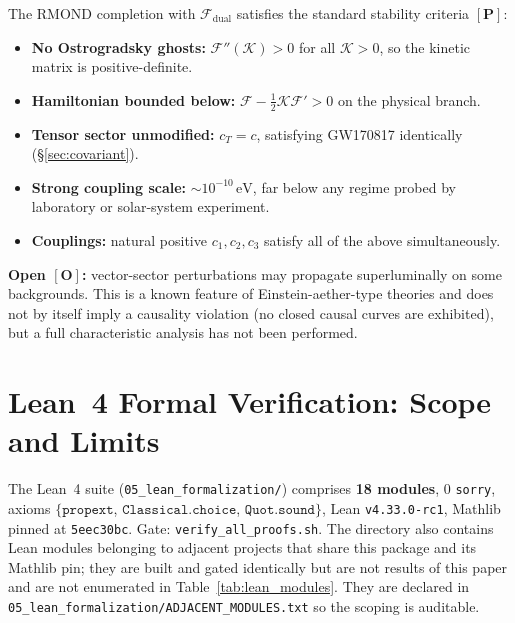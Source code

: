 \documentclass[aps,prd,preprint,superscriptaddress,nofootinbib,amsmath,amssymb,floatfix]{revtex4-2}
\begin{document}
The RMOND completion with $\mathcal{F}_{\text{dual}}$ satisfies the standard stability criteria $\mathbf{[P]}$:
\begin{itemize}
    \item \textbf{No Ostrogradsky ghosts:} $\mathcal{F}''(\mathcal{K}) > 0$ for all $\mathcal{K}>0$, so the kinetic matrix is positive-definite.
    \item \textbf{Hamiltonian bounded below:} $\mathcal{F} - \tfrac{1}{2}\mathcal{K}\mathcal{F}' > 0$ on the physical branch.
    \item \textbf{Tensor sector unmodified:} $c_T = c$, satisfying GW170817 identically (\S\ref{sec:covariant}).
    \item \textbf{Strong coupling scale:} $\sim10^{-10}\,\text{eV}$, far below any regime probed by laboratory or solar-system experiment.
    \item \textbf{Couplings:} natural positive $c_1,c_2,c_3$ satisfy all of the above simultaneously.
\end{itemize}
\textbf{Open $\mathbf{[O]}$:} vector-sector perturbations may propagate superluminally on some backgrounds. This is a known feature of Einstein-aether-type theories and does not by itself imply a causality violation (no closed causal curves are exhibited), but a full characteristic analysis has not been performed.

\section{Lean~4 Formal Verification: Scope and Limits}
\label{sec:lean}

The Lean~4 suite (\texttt{05\_lean\_}\allowbreak\texttt{formalization/}) comprises \textbf{18 modules}, 0 \texttt{sorry}, axioms $\{\texttt{propext}$, $\texttt{Classical.choice}$, $\texttt{Quot.sound}\}$, Lean \texttt{v4.33.0-rc1}, Mathlib pinned at \texttt{5eec30bc}. Gate: \texttt{verify\_}\allowbreak\texttt{all\_proofs.sh}. The directory also contains Lean modules belonging to adjacent projects that share this package and its Mathlib pin; they are built and gated identically but are not results of this paper and are not enumerated in Table~\ref{tab:lean_modules}. They are declared in \texttt{05\_lean\_}\allowbreak\texttt{formalization/}\allowbreak\texttt{ADJACENT\_MODULES.txt} so the scoping is auditable.
\end{document}
